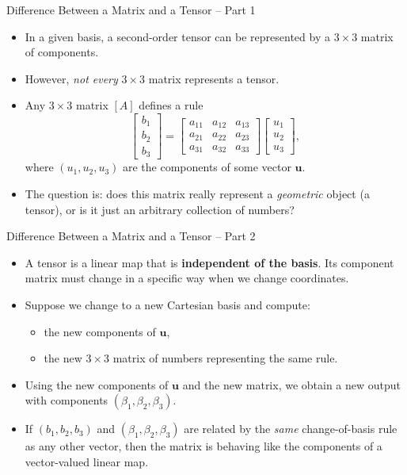 \documentclass{beamer}
\begin{document}
\begin{frame}{Difference Between a Matrix and a Tensor -- Part 1}

\begin{itemize}
    \item In a given basis, a second-order tensor can be represented by a
          $3 \times 3$ matrix of components.
    \item However, \emph{not every} $3 \times 3$ matrix represents a tensor.
    \item Any $3 \times 3$ matrix $[A]$ defines a rule
    \[
        \begin{bmatrix} b_1 \\[2pt] b_2 \\[2pt] b_3 \end{bmatrix}
        =
        \begin{bmatrix}
            a_{11} & a_{12} & a_{13} \\
            a_{21} & a_{22} & a_{23} \\
            a_{31} & a_{32} & a_{33}
        \end{bmatrix}
        \begin{bmatrix} u_1 \\[2pt] u_2 \\[2pt] u_3 \end{bmatrix},
    \]
    where $(u_1,u_2,u_3)$ are the components of some vector $\mathbf{u}$.
    \item The question is: does this matrix really represent a
          \emph{geometric} object (a tensor), or is it just an arbitrary
          collection of numbers?
\end{itemize}

\end{frame}

\begin{frame}{Difference Between a Matrix and a Tensor -- Part 2}

\begin{itemize}
    \item A tensor is a linear map that is \textbf{independent of the basis}.
          Its component matrix must change in a specific way when we change
          coordinates.
    \item Suppose we change to a new Cartesian basis and compute:
    \begin{itemize}
        \item the new components of $\mathbf{u}$,
        \item the new $3 \times 3$ matrix of numbers representing the same rule.
    \end{itemize}
    \item Using the new components of $\mathbf{u}$ and the new matrix,
          we obtain a new output with components $(\beta_1,\beta_2,\beta_3)$.
    \item If $(b_1,b_2,b_3)$ and $(\beta_1,\beta_2,\beta_3)$ are related by the
          \emph{same} change-of-basis rule as any other vector, then the matrix
          is behaving like the components of a vector-valued linear map.
\end{itemize}

\end{frame}
\end{document}
